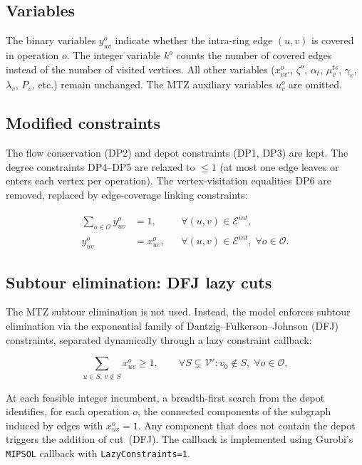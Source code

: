 \documentclass[12pt]{article}
\begin{document}
\subsection*{Variables}

The binary variables $y_{uv}^o$ indicate whether the intra-ring edge $(u,v)$ is
covered in operation $o$. The integer variable $k^o$ counts the number of
covered edges instead of the number of visited vertices. All other variables
($x_{vv'}^o$, $\zeta^o$, $\alpha_t$, $\mu_v^{ts}$, $\gamma_v$, $\lambda_v$,
$P_v$, etc.) remain unchanged. The MTZ auxiliary variables $u_v^o$ are omitted.

\subsection*{Modified constraints}

The flow conservation (DP2) and depot constraints (DP1, DP3) are kept. The
degree constraints DP4--DP5 are relaxed to $\le 1$ (at most one edge leaves
or enters each vertex per operation). The vertex-visitation equalities
DP6 are removed, replaced by edge-coverage linking constraints:

\begin{align}
  \sum_{o\in\mathcal O} y_{uv}^o &= 1,
    &&\forall (u,v)\in\mathcal E^{int}, \tag{EC1}\\
  y_{uv}^o &= x_{uv}^o,
    &&\forall (u,v)\in\mathcal E^{int},\; \forall o\in\mathcal O. \tag{EC2}
\end{align}

\subsection*{Subtour elimination: DFJ lazy cuts}

The MTZ subtour elimination is not used. Instead, the model enforces subtour
elimination via the exponential family of Dantzig--Fulkerson--Johnson (DFJ)
constraints, separated dynamically through a lazy constraint callback:

\begin{equation}
  \sum_{u\in S,\,v\notin S} x_{uv}^o \ge 1,
    \qquad \forall S\subsetneq\mathcal V': v_0\notin S,\; \forall o\in\mathcal O,
    \tag{DFJ}
\end{equation}

At each feasible integer incumbent, a breadth-first search from the depot
identifies, for each operation $o$, the connected components of the subgraph
induced by edges with $x_{uv}^o = 1$. Any component that does not contain the
depot triggers the addition of cut~(DFJ). The callback is implemented using
Gurobi's \texttt{MIPSOL} callback with \texttt{LazyConstraints=1}.
\end{document}
